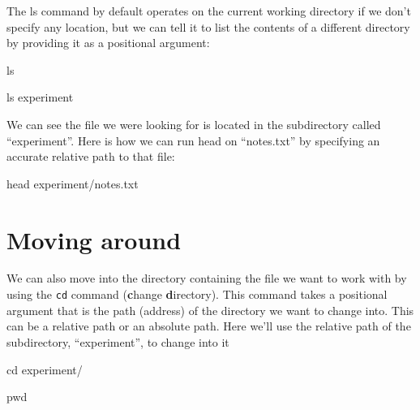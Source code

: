 \documentclass[
]{book}
\newenvironment{Shaded}{\begin{snugshade}}{\end{snugshade}}
\newcommand{\BuiltInTok}[1]{#1}
\newcommand{\FunctionTok}[1]{\textcolor[rgb]{0.00,0.00,0.00}{#1}}
\newcommand{\NormalTok}[1]{#1}
\begin{document}
The ls command by default operates on the current working directory if we don't specify any location, but we can tell it to list the contents of a different directory by providing it as a positional argument:

\begin{Shaded}
\begin{Highlighting}[]
    \FunctionTok{ls}
\end{Highlighting}
\end{Shaded}

\begin{Shaded}
\begin{Highlighting}[]
    \FunctionTok{ls}\NormalTok{ experiment}
\end{Highlighting}
\end{Shaded}

We can see the file we were looking for is located in the subdirectory called ``experiment''. Here is how we can run head on ``notes.txt'' by specifying an accurate relative path to that file:

\begin{Shaded}
\begin{Highlighting}[]
    \FunctionTok{head}\NormalTok{ experiment/notes.txt}
\end{Highlighting}
\end{Shaded}

\hypertarget{moving-around}{%
\section{Moving around}\label{moving-around}}

We can also move into the directory containing the file we want to work with by using the \texttt{cd} command (\textbf{c}hange \textbf{d}irectory). This command takes a positional argument that is the path (address) of the directory we want to change into. This can be a relative path or an absolute path. Here we'll use the relative path of the subdirectory, ``experiment'', to change into it

\begin{Shaded}
\begin{Highlighting}[]
    \BuiltInTok{cd}\NormalTok{ experiment/}
\end{Highlighting}
\end{Shaded}

\begin{Shaded}
\begin{Highlighting}[]
    \BuiltInTok{pwd}
\end{Highlighting}
\end{Shaded}
\end{document}
